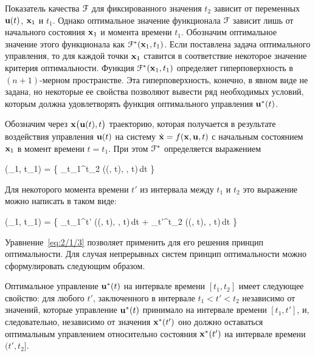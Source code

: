 Показатель качества $\mathcal{F}$ для фиксированного значения $t_2$ зависит от переменных $\mathbf{u}(t)$, $\mathbf{x}_1$ и $t_1$. Однако оптимальное значение функционала $\mathcal{F}$ зависит лишь от начального состояния $\mathbf{x}_1$ и момента времени $t_1$. Обозначим оптимальное значение этого функционала как $\mathcal{F}^{*}(\mathbf{x}_1, t_1)$. Если поставлена задача оптимального управления, то для каждой точки $\mathbf{x}_1$ ставится в соответствие некоторое значение критерия оптимальности. Функция $\mathcal{F}^{*}(\mathbf{x}_1, t_1)$ определяет гиперповерхность в $(n+1)$-мерном пространстве. Эта гиперповерхность, конечно, в явном виде не задана, но некоторые ее свойства позволяют вывести ряд необходимых условий, которым должна удовлетворять функция оптимального управления ${\mathbf{u}^{*}}(t)$.

Обозначим через $\mathbf{x} \bigl( \mathbf{u}(t), t \bigr)$ траекторию, которая получается в результате воздействия управления $\mathbf{u}(t)$ на систему $\dot{\mathbf{x}} = f(\mathbf{x}, \mathbf{u}, t)$ с начальным состоянием $\mathbf{x}_1$ в момент времени $t = t_1$. При этом $\mathcal{F}^{*}$ определяется выражением

    \optF(_1, t_1) =  \biggl\{ \int\limits_{t_1}^{t_2} \funcL\bigl((, t), , t\bigr)\,dt \biggr\} 
\eeq

Для некоторого момента времени $t'$ из интервала между $t_1$ и $t_2$ это выражение можно написать в таком виде:

    \optF(_1, t_1) =  \biggl\{ \int\limits_{t_1}^{t'} \funcL\bigl((, t), , t\bigr)\,dt + \int\limits_{t'}^{t_2} \funcL\bigl((, t), , t\bigr)\,dt \biggr\} 
\eeq

Уравнение~\ref{eq:2/1/3} позволяет применить для его решения принцип оптимальности. Для случая непрерывных систем принцип оптимальности можно сформулировать следующим образом.

\begin{statement}
	Оптимальное управление ${\mathbf{u}^{*}}(t)$ на интервале времени $[t_1, t_2]$ имеет следующее свойство: для любого $t'$, заключенного в интервале $t_1 < t' < t_2$ независимо от значений, которые управление ${\mathbf{u}^{*}}(t)$ принимало на интервале времени $[t_1, t']$, и, следовательно, независимо от значения ${\mathbf{x}^{*}}(t')$ оно должно оставаться оптимальным управлением относительно состояния ${\mathbf{x}^{*}}(t')$ на интервале времени $(t', t_2]$.
\end{statement}

